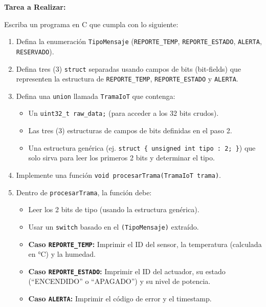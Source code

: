 \textbf{Tarea a Realizar:}

Escriba un programa en C que cumpla con lo siguiente:

\begin{enumerate}
    \item Defina la enumeración \texttt{TipoMensaje} (\texttt{REPORTE\_TEMP}, \texttt{REPORTE\_ESTADO}, \texttt{ALERTA}, \texttt{RESERVADO}).

    \item Defina tres (3) \texttt{struct} separadas usando campos de bits (bit-fields) que representen la estructura de \texttt{REPORTE\_TEMP}, \texttt{REPORTE\_ESTADO} y \texttt{ALERTA}.

    \item Defina una \texttt{union} llamada \texttt{TramaIoT} que contenga:
    \begin{itemize}
        \item Un \texttt{uint32\_t raw\_data;} (para acceder a los 32 bits crudos).
        \item Las tres (3) estructuras de campos de bits definidas en el paso 2.
        \item Una estructura genérica (ej. \texttt{struct \{ unsigned int tipo : 2; \}}) que solo sirva para leer los primeros 2 bits y determinar el tipo.
    \end{itemize}

    \item Implemente una función \texttt{void procesarTrama(TramaIoT trama)}.

    \item Dentro de \texttt{procesarTrama}, la función debe:
    \begin{itemize}
        \item Leer los 2 bits de tipo (usando la estructura genérica).
        \item Usar un \texttt{switch} basado en el \texttt{(TipoMensaje)} extraído.
        \item \textbf{Caso \texttt{REPORTE\_TEMP}:} Imprimir el ID del sensor, la temperatura (calculada en °C) y la humedad.
        \item \textbf{Caso \texttt{REPORTE\_ESTADO}:} Imprimir el ID del actuador, su estado (``ENCENDIDO'' o ``APAGADO'') y su nivel de potencia.
        \item \textbf{Caso \texttt{ALERTA}:} Imprimir el código de error y el timestamp.
    \end{itemize}


\end{enumerate}
